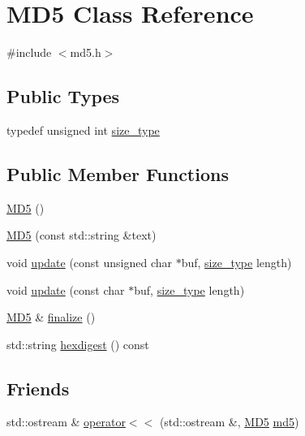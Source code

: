 \hypertarget{class_m_d5}{\section{M\+D5 Class Reference}
\label{class_m_d5}
}


{\ttfamily \#include $<$md5.\+h$>$}

\subsection*{Public Types}
\begin{DoxyCompactItemize}
\item 
typedef unsigned int \hyperlink{class_m_d5_aa836972700679dbcff6ae8337f6db464}{size\+\_\+type}
\end{DoxyCompactItemize}
\subsection*{Public Member Functions}
\begin{DoxyCompactItemize}
\item 
\hyperlink{class_m_d5_afa6155ec36de415ab2dcf5e54b670d13}{M\+D5} ()
\item 
\hyperlink{class_m_d5_a155356ffd713345e69e6dcbd9f8da6ce}{M\+D5} (const std\+::string \&text)
\item 
void \hyperlink{class_m_d5_ac5ddf6cd8f940422396d321ea90ed045}{update} (const unsigned char $\ast$buf, \hyperlink{class_m_d5_aa836972700679dbcff6ae8337f6db464}{size\+\_\+type} length)
\item 
void \hyperlink{class_m_d5_ac5ccba375539b993958fb235f8ac849c}{update} (const char $\ast$buf, \hyperlink{class_m_d5_aa836972700679dbcff6ae8337f6db464}{size\+\_\+type} length)
\item 
\hyperlink{class_m_d5}{M\+D5} \& \hyperlink{class_m_d5_a10f607494a3f2e3e515fc4b99d1a06cc}{finalize} ()
\item 
std\+::string \hyperlink{class_m_d5_ad36c65acf87e397bf717bc3defbc0c7a}{hexdigest} () const 
\end{DoxyCompactItemize}
\subsection*{Friends}
\begin{DoxyCompactItemize}
\item 
std\+::ostream \& \hyperlink{class_m_d5_a0739666fd0f3a7117546f6c50e0783b2}{operator$<$$<$} (std\+::ostream \&, \hyperlink{class_m_d5}{M\+D5} \hyperlink{md5_8h_a92c6eed2e9b51298af559aff6792770b}{md5})
\end{DoxyCompactItemize}


